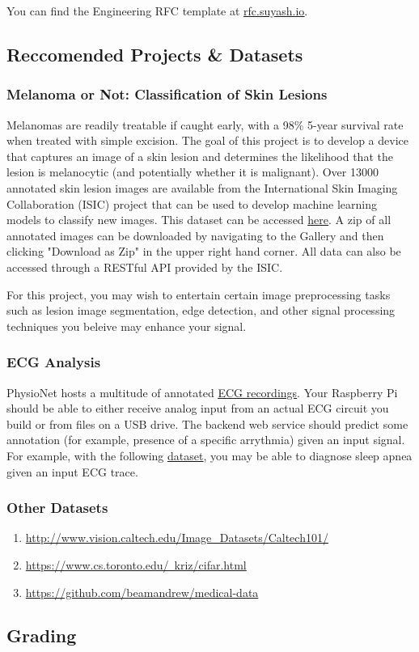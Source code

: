 You can find the Engineering RFC template at \underline{\href{http://rfc.suyash.io}{rfc.suyash.io}}.

\subsection*{Reccomended Projects \& Datasets}
\subsubsection*{Melanoma or Not: Classification of Skin Lesions}
Melanomas are readily treatable if caught early, with a 98\% 5-year survival rate when treated with simple excision. The goal of this project is to develop a device that captures an image of a skin lesion and determines the likelihood that the lesion is melanocytic (and potentially whether it is malignant). Over 13000 annotated skin lesion images are available from the International Skin Imaging Collaboration (ISIC) project that can be used to develop machine learning models to classify new images. This dataset can be accessed \underline{\href{https://isic-archive.com}{here}}. A zip of all annotated images can be downloaded by navigating to the Gallery and then clicking "Download as Zip" in the upper right hand corner. All data can also be accessed through a RESTful API provided by the ISIC.

For this project, you may wish to entertain certain image preprocessing tasks such as lesion image segmentation, edge detection, and other signal processing techniques you beleive may enhance your signal.

\subsubsection*{ECG Analysis}
PhysioNet hosts a multitude of annotated \underline{\href{https://physionet.org/physiobank/database/\#ecg}{ECG recordings}}. Your Raspberry Pi should be able to either receive analog input from an actual ECG circuit you build or from files on a USB drive. The backend web service should predict some annotation (for example, presence of a specific arrythmia) given an input signal. For example, with the following \underline{\href{https://www.physionet.org/physiobank/database/apnea-ecg/}{dataset}}, you may be able to diagnose sleep apnea given an input ECG trace.

\subsubsection*{Other Datasets}
\begin{enumerate}
	\item \href{http://www.vision.caltech.edu/Image_Datasets/Caltech101/}{http://www.vision.caltech.edu/Image\_Datasets/Caltech101/}
	\item \href{https://www.cs.toronto.edu/~kriz/cifar.html}{https://www.cs.toronto.edu/~kriz/cifar.html}
	\item \href{https://github.com/beamandrew/medical-data}{https://github.com/beamandrew/medical-data}
\end{enumerate}


\subsection{Grading}


